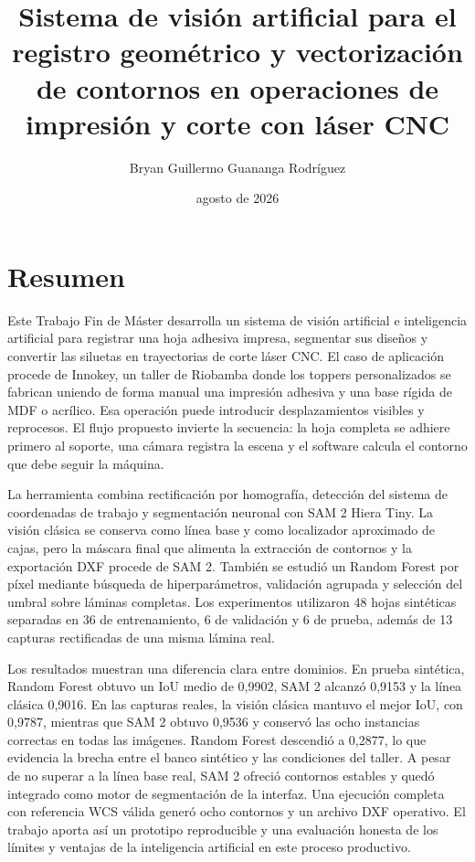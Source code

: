 \documentclass[11pt,a4paper,spanish]{book}
\title{Sistema de visión artificial para el registro geométrico y vectorización de contornos en operaciones de impresión y corte con láser CNC}
\author{Bryan Guillermo Guananga Rodríguez}
\date{agosto de 2026}
\numberwithin{equation}{chapter}
\numberwithin{figure}{chapter}
\numberwithin{table}{chapter}
\begin{document}
\renewcommand{\listfigurename}{Índice de Ilustraciones}
\renewcommand{\listtablename}{Índice de Tablas}
\renewcommand{\contentsname}{Índice de Contenidos}
\renewcommand{\figurename}{Figura}
\renewcommand{\tablename}{Tabla}

\maketitle

\frontmatter
\tableofcontents
\listoffigures
\listoftables

\chapter*{Resumen}
Este Trabajo Fin de Máster desarrolla un sistema de visión artificial e inteligencia artificial para registrar una hoja adhesiva impresa, segmentar sus diseños y convertir las siluetas en trayectorias de corte láser CNC. El caso de aplicación procede de Innokey, un taller de Riobamba donde los toppers personalizados se fabrican uniendo de forma manual una impresión adhesiva y una base rígida de MDF o acrílico. Esa operación puede introducir desplazamientos visibles y reprocesos. El flujo propuesto invierte la secuencia: la hoja completa se adhiere primero al soporte, una cámara registra la escena y el software calcula el contorno que debe seguir la máquina.

La herramienta combina rectificación por homografía, detección del sistema de coordenadas de trabajo y segmentación neuronal con SAM 2 Hiera Tiny. La visión clásica se conserva como línea base y como localizador aproximado de cajas, pero la máscara final que alimenta la extracción de contornos y la exportación DXF procede de SAM 2. También se estudió un Random Forest por píxel mediante búsqueda de hiperparámetros, validación agrupada y selección del umbral sobre láminas completas. Los experimentos utilizaron 48 hojas sintéticas separadas en 36 de entrenamiento, 6 de validación y 6 de prueba, además de 13 capturas rectificadas de una misma lámina real.

Los resultados muestran una diferencia clara entre dominios. En prueba sintética, Random Forest obtuvo un IoU medio de 0,9902, SAM 2 alcanzó 0,9153 y la línea clásica 0,9016. En las capturas reales, la visión clásica mantuvo el mejor IoU, con 0,9787, mientras que SAM 2 obtuvo 0,9536 y conservó las ocho instancias correctas en todas las imágenes. Random Forest descendió a 0,2877, lo que evidencia la brecha entre el banco sintético y las condiciones del taller. A pesar de no superar a la línea base real, SAM 2 ofreció contornos estables y quedó integrado como motor de segmentación de la interfaz. Una ejecución completa con referencia WCS válida generó ocho contornos y un archivo DXF operativo. El trabajo aporta así un prototipo reproducible y una evaluación honesta de los límites y ventajas de la inteligencia artificial en este proceso productivo.
\end{document}
